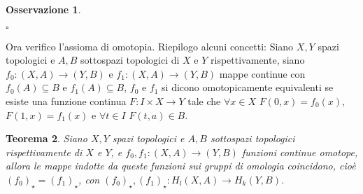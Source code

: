 \documentclass[10pt, twoside=false, x11names]{scrbook}
\newtheorem{theorem}{Teorema}[section]
\newtheorem{osservation}[theorem]{Osservazione}
\newenvironment{proof}{{\textbf{Dimostrazione}:}}{\hfill $\square$}
\begin{document}
\begin{proof}
\begin{osservation}
  \end{osservation}

\end{proof}


Ora verifico l'assioma di omotopia. Riepilogo alcuni concetti: Siano $ X, Y $
spazi topologici e $ A, B $ sottospazi topologici di $ X $ e $ Y $
rispettivamente, siano $ f_0 \colon (X, A) \to (Y,B) $ e
$ f_1 \colon (X,A) \to (Y,B) $ mappe continue con $ f_0(A) \subseteq B $ e
$ f_1(A) \subseteq B $, $ f_0 $ e $ f_1 $ si dicono omotopicamente equivalenti se esiste
una funzione continua $ F \colon I \times X \to Y $ tale che $ \forall x \in X $
$ F(0,x) = f_0(x) $, $ F(1,x) = f_1(x) $ e $ \forall t \in I $ $ F(t,a) \in B $.

\begin{theorem}
  Siano $ X, Y $ spazi topologici e $ A, B $ sottospazi topologici rispettivamente
  di $ X $ e $ Y $, e $ f_0, f_1 \colon (X, A) \to (Y, B) $ funzioni continue omotope,
  allora le mappe indotte da queste funzioni sui gruppi di omologia coincidono,
  cioè $ (f_0)_\star = (f_1)_\star $, con $ (f_0)_\star, (f_1)_\star \colon H_l(X,A) \to H_k(Y,B) $.
\end{theorem}
\end{document}
